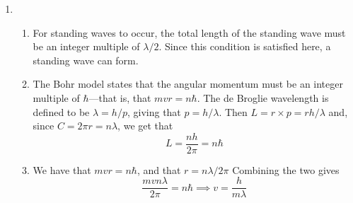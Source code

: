 \documentclass[10pt]{article}
\begin{document}
\begin{enumerate}
    \item \begin{enumerate}
        \item For standing waves to occur, the total length of the standing wave must be an integer multiple of $\lambda/2$. Since this condition is satisfied here, a standing wave can form.

        \item The Bohr model states that the angular momentum must be an integer multiple of $\hbar$---that is, that $mvr = n\hbar$. The de Broglie wavelength is defined to be $\lambda = h/p$, giving that $p = h/\lambda$. Then $L = r\times p = rh/\lambda$ and, since $C = 2\pi r = n \lambda$, we get that
        \begin{equation*}
            L = \frac{n h}{2\pi} = n\hbar
        \end{equation*}

        \item We have that $mvr = n\hbar$, and that $r = n \lambda / 2\pi$ Combining the two gives
        \begin{equation*}
            \frac{mvn\lambda}{2\pi} = n\hbar \implies v = \frac{h}{m\lambda}
         \end{equation*}
    \end{enumerate}



  \end{enumerate}
\end{document}
